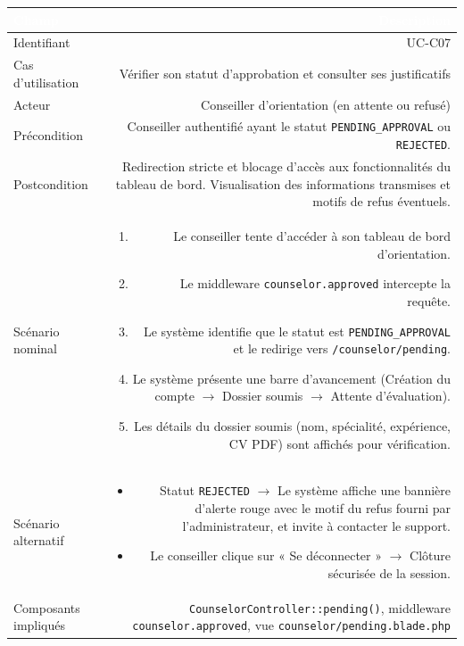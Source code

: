 \documentclass[a4paper,12pt]{article}
\begin{document}
\noindent
\begin{tabular}{|L|R|}
\hline
{}\textcolor{white}{\textbf{Champ}} & \textcolor{white}{\textbf{Description}} \\
\hline
{}Identifiant & UC-C07 \\
\hline
Cas d'utilisation & Vérifier son statut d'approbation et consulter ses justificatifs \\
\hline
{}Acteur & Conseiller d'orientation (en attente ou refusé) \\
\hline
Précondition & Conseiller authentifié ayant le statut \texttt{PENDING\_APPROVAL} ou \texttt{REJECTED}. \\
\hline
{}Postcondition & Redirection stricte et blocage d'accès aux fonctionnalités du tableau de bord. Visualisation des informations transmises et motifs de refus éventuels. \\
\hline
Scénario nominal &
\begin{enumerate}
  \item Le conseiller tente d'accéder à son tableau de bord d'orientation.
  \item Le middleware \texttt{counselor.approved} intercepte la requête.
  \item Le système identifie que le statut est \texttt{PENDING\_APPROVAL} et le redirige vers \texttt{/counselor/pending}.
  \item Le système présente une barre d'avancement (Création du compte $\rightarrow$ Dossier soumis $\rightarrow$ Attente d'évaluation).
  \item Les détails du dossier soumis (nom, spécialité, expérience, CV PDF) sont affichés pour vérification.
\end{enumerate} \\
\hline
{}Scénario alternatif &
\begin{itemize}
  \item Statut \texttt{REJECTED} $\rightarrow$ Le système affiche une bannière d'alerte rouge avec le motif du refus fourni par l'administrateur, et invite à contacter le support.
  \item Le conseiller clique sur « Se déconnecter » $\rightarrow$ Clôture sécurisée de la session.
\end{itemize} \\
\hline
Composants impliqués & \texttt{CounselorController::pending()}, middleware \texttt{counselor.approved}, vue \texttt{counselor/pending.blade.php} \\
\hline
\end{tabular}
\end{document}
